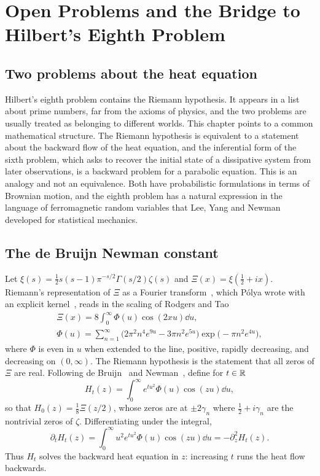 \chapter{Open Problems and the Bridge to Hilbert's Eighth Problem}
\label{ch:open}

\section{Two problems about the heat equation}

Hilbert's eighth problem contains the Riemann hypothesis. It appears in a list about prime numbers, far from the axioms of physics, and the two problems are usually treated as belonging to different worlds. This chapter points to a common mathematical structure. The Riemann hypothesis is equivalent to a statement about the backward flow of the heat equation, and the inferential form of the sixth problem, which asks to recover the initial state of a dissipative system from later observations, is a backward problem for a parabolic equation. This is an analogy and not an equivalence. Both have probabilistic formulations in terms of Brownian motion, and the eighth problem has a natural expression in the language of ferromagnetic random variables that Lee, Yang and Newman developed for statistical mechanics.

\section{The de Bruijn Newman constant}

Let $\xi(s) = \frac12s(s-1)\pi^{-s/2}\Gamma(s/2)\zeta(s)$ and $\Xi(x) = \xi(\frac12+ix)$. Riemann's representation of $\Xi$ as a Fourier transform~\cite{riemann1859}, which P\'olya wrote with an explicit kernel~\cite{polya1926}, reads in the scaling of Rodgers and Tao~\cite{rodgerstao2020}
\begin{gather*}
\Xi(x) = 8\int_0^\infty\Phi(u)\cos(2xu)\dd u, \\
\Phi(u) = \sum_{n=1}^\infty\big(2\pi^2n^4e^{9u}-3\pi n^2e^{5u}\big)\exp\big(-\pi n^2e^{4u}\big),
\end{gather*}
where $\Phi$ is even in $u$ when extended to the line, positive, rapidly decreasing, and decreasing on $(0,\infty)$. The Riemann hypothesis is the statement that all zeros of $\Xi$ are real. Following de Bruijn~\cite{debruijn1950} and Newman~\cite{newman1976}, define for $t\in\mathbb{R}$
\[
H_t(z) = \int_0^\infty e^{tu^2}\Phi(u)\cos(zu)\dd u,
\]
so that $H_0(z) = \frac18\Xi(z/2)$, whose zeros are at $\pm2\gamma_n$ where $\frac12+i\gamma_n$ are the nontrivial zeros of $\zeta$. Differentiating under the integral,
\[
\partial_tH_t(z) = \int_0^\infty u^2e^{tu^2}\Phi(u)\cos(zu)\dd u = -\partial_z^2H_t(z).
\]
Thus $H_t$ solves the backward heat equation in $z$: increasing $t$ runs the heat flow backwards.

